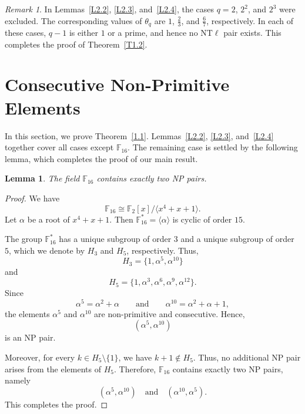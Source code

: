 \documentclass[12pt]{amsart}
\newtheorem{lemma}[theorem]{Lemma}
\theoremstyle{definition}
\theoremstyle{remark}
\newtheorem*{remark}{Remark}
\numberwithin{equation}{section}
\begin{document}
\begin{remark}
In Lemmas~\ref{L2.2}, \ref{L2.3}, and~\ref{L2.4}, the cases $q=2$, $2^2$, and $2^3$ were excluded. The corresponding values of $\theta_q$ are $1$, $\frac{2}{3}$, and $\frac{6}{7}$, respectively. In each of these cases, $q-1$ is either $1$ or a prime, and hence no $\mathrm{NT}\ell$ pair exists. This completes the proof of Theorem~\ref{T1.2}.
\end{remark}
\section{Consecutive Non-Primitive Elements}
In this section, we prove Theorem~\ref{1.1}. Lemmas~\ref{L2.2}, \ref{L2.3}, and~\ref{L2.4} together cover all cases except $\mathbb{F}_{16}$. The remaining case is settled by the following lemma, which completes the proof of our main result.
\begin{lemma}
The field $\mathbb{F}_{16}$ contains exactly two NP pairs.
\end{lemma}
\begin{proof}
We have
\[
\mathbb{F}_{16}\cong \mathbb{F}_2[x]/\langle x^4+x+1\rangle.
\]
Let $\alpha$ be a root of $x^4+x+1$. Then $\mathbb{F}_{16}^*=\langle\alpha\rangle$ is cyclic of order $15$.

The group $\mathbb{F}_{16}^*$ has a unique subgroup of order $3$ and a unique subgroup of order $5$, which we denote by $H_3$ and $H_5$, respectively. Thus,
\[
H_3=\{1,\alpha^5,\alpha^{10}\}
\]
and
\[
H_5=\{1,\alpha^3,\alpha^6,\alpha^9,\alpha^{12}\}.
\]
Since
\[
\alpha^5=\alpha^2+\alpha
\qquad\text{and}\qquad
\alpha^{10}=\alpha^2+\alpha+1,
\]
the elements $\alpha^5$ and $\alpha^{10}$ are non-primitive and consecutive. Hence,
\[
(\alpha^5,\alpha^{10})
\]
is an NP pair.

Moreover, for every $k\in H_5\setminus\{1\}$, we have $k+1\notin H_5$. Thus, no additional NP pair arises from the elements of $H_5$. Therefore, $\mathbb{F}_{16}$ contains exactly two NP pairs, namely
\[
(\alpha^5,\alpha^{10})
\quad\text{and}\quad
(\alpha^{10},\alpha^5).
\]
This completes the proof.
\end{proof}
\end{document}
